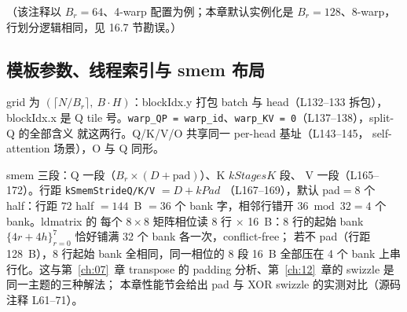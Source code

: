 （该注释以 $B_r{=}64$、4-warp 配置为例；本章默认实例化是
$B_r{=}128$、8-warp，行划分逻辑相同，见 16.7 节勘误。）

\subsection{模板参数、线程索引与 smem 布局}





grid 为 $(\lceil N/B_r\rceil,\ B\cdot H)$：blockIdx.y 打包 batch 与
head（L132--133 拆包），blockIdx.x 是 Q tile 号。\texttt{warp\_QP =
warp\_id}、\texttt{warp\_KV = 0}（L137--138），split-Q 的全部含义
就这两行。Q/K/V/O 共享同一 per-head 基址（L143--145，
self-attention 场景），O 与 Q 同形。



smem 三段：Q 一段（$B_r\times(D{+}\mathrm{pad})$）、K $kStagesK$ 段、
V 一段（L165--172）。行距 \texttt{k\allowbreak{}Smem\allowbreak{}Stride\allowbreak{}Q/\allowbreak{}K/\allowbreak{}V} $= D + kPad$
（L167--169），默认 pad$=$8 个 half：行距 $72$ half $=144$~B
$=36$ 个 bank 字，相邻行错开 $36 \bmod 32 = 4$ 个 bank。ldmatrix 的
每个 $8\times8$ 矩阵相位读 8 行 $\times$ 16~B：8 行的起始 bank
$\{4r{+}4h\}_{r=0}^{7}$ 恰好铺满 32 个 bank 各一次，conflict-free；
若不 pad（行距 128~B），8 行起始 bank 全相同，同一相位的 8 段 16~B
全部压在 4 个 bank 上串行化。这与第~\ref{ch:07}~章 transpose 的
padding 分析、第~\ref{ch:12}~章的 swizzle 是同一主题的三种解法；
本章性能节会给出 pad 与 XOR swizzle 的实测对比（源码注释 L61--71）。


